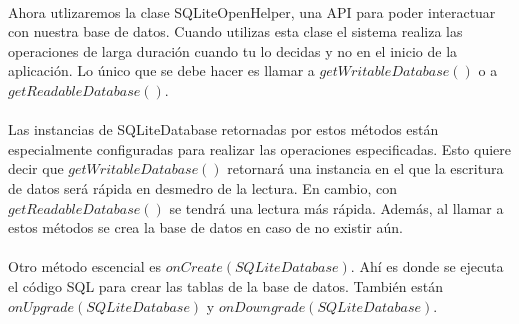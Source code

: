 \documentclass[10pt]{extarticle}
\begin{document}
\paragraph{}
Ahora utlizaremos la clase SQLiteOpenHelper, una API para poder interactuar con nuestra base de datos. Cuando utilizas esta clase el sistema realiza las operaciones de larga duración cuando tu lo decidas y no en el inicio de la aplicación. Lo único que se debe hacer es llamar a $getWritableDatabase()$ o a $getReadableDatabase()$. 
\paragraph{}
Las instancias de SQLiteDatabase retornadas por estos métodos están especialmente configuradas para realizar las operaciones especificadas. Esto quiere decir que $getWritableDatabase()$ retornará una instancia en el que la escritura de datos será rápida en desmedro de la lectura. En cambio, con $getReadableDatabase()$ se tendrá una lectura más rápida. Además, al llamar a estos métodos se crea la base de datos en caso de no existir aún.

\paragraph{}
Otro método escencial es $onCreate(SQLiteDatabase)$. Ahí es donde se ejecuta el código SQL para crear las tablas de la base de datos. También están $onUpgrade(SQLiteDatabase)$ y $onDowngrade(SQLiteDatabase)$.
\end{document}

